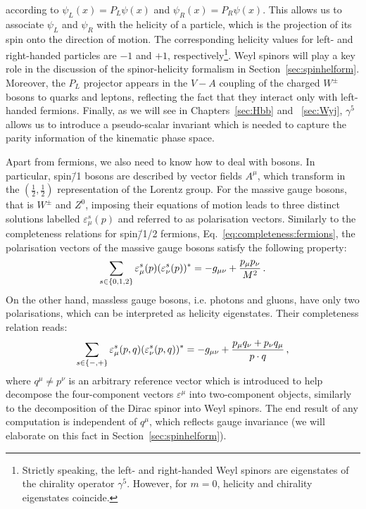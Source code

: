 \documentclass[main.tex]{subfiles}
\begin{document}
according to $\psi_L(x) = P_L\psi(x)$ and $\psi_R(x) = P_R\psi(x)$. This allows us to associate $\psi_L$ and $\psi_R$ with the helicity of a particle, which is the projection of its spin onto the direction of motion. The corresponding helicity values for left- and right-handed particles are $-1$ and $+1$, respectively\footnote{Strictly speaking, the left- and right-handed Weyl spinors are eigenstates of the chirality operator $\gamma^5$. However, for $m=0$, helicity and chirality eigenstates coincide.}. Weyl spinors will play a key role in the discussion of the spinor-helicity formalism in Section~\ref{sec:spinhelform}. Moreover, the $P_L$ projector appears in the $V-A$ coupling of the charged $W^\pm$ bosons to quarks and leptons, reflecting the fact that they interact only with left-handed fermions. Finally, as we will see in Chapters~\ref{sec:Hbb} and ~\ref{sec:Wyj}, $\gamma^5$ allows us to introduce a pseudo-scalar invariant which is needed to capture the parity information of the kinematic phase space. 

Apart from fermions, we also need to know how to deal with bosons. In particular, spin\=/1 bosons are described by vector fields $A^\mu$, which transform in the $(\frac{1}{2}, \frac{1}{2})$ representation of the Lorentz group. For the massive gauge bosons, that is $W^\pm$ and $Z^0$, imposing their equations of motion leads to three distinct solutions labelled $\varepsilon_\mu^s(p)$ and referred to as polarisation vectors.
Similarly to the completeness relations for spin\=/1/2 fermions, Eq.~\ref{eq:completeness:fermions}, the polarisation vectors of the massive gauge bosons satisfy the following property:
\begin{equation}
    \sum_{s \in \{0,1,2\}} \varepsilon_\mu^s(p) (\varepsilon_\nu^s(p))^{\ast} = -g_{\mu\nu} + \frac{p_\mu p_\nu}{M^2} \,.
\end{equation}
On the other hand, massless gauge bosons, i.e. photons and gluons, have only two polarisations, which can be interpreted as helicity eigenstates. Their completeness relation reads:
\begin{equation} \label{eq:completeness:bosons}
    \sum_{s \in \{-,+\}} \varepsilon_\mu^s(p, q) (\varepsilon_\nu^s(p, q))^{\ast} = -g_{\mu\nu} + \frac{p_\mu q_\nu + p_\nu q_\mu}{p \cdot q} \,,
\end{equation}
where $q^\mu \neq p^\nu$ is an arbitrary reference vector which is introduced to help decompose the four-component vectors $\varepsilon^\mu$ into two-component objects, similarly to the decomposition of the Dirac spinor into Weyl spinors. The end result of any computation is independent of $q^\mu$, which reflects gauge invariance (we will elaborate on this fact in Section~\ref{sec:spinhelform}). 
\end{document}
